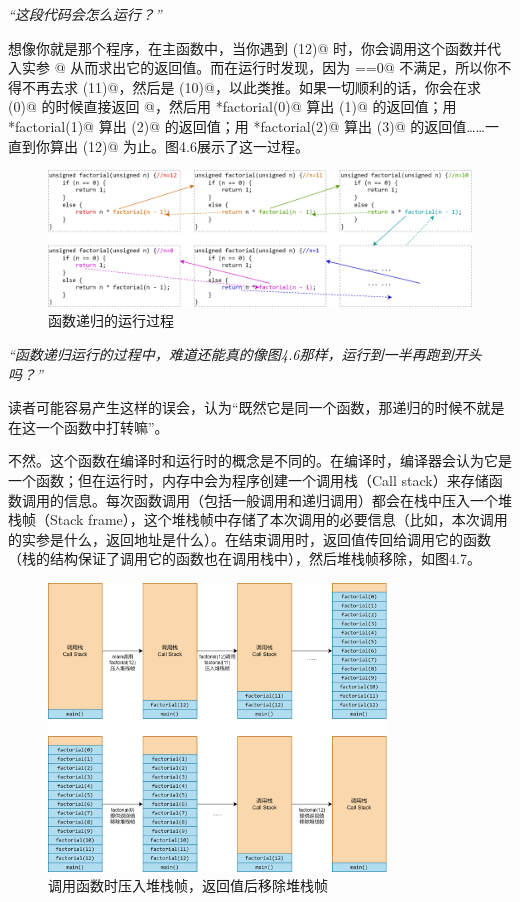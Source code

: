 \textit{``这段代码会怎么运行？''}\par
想像你就是那个程序，在主函数中，当你遇到 \lstinline@factorial(12)@ 时，你会调用这个函数并代入实参 @ 从而求出它的返回值。而在运行时发现，因为 \lstinline@n==0@ 不满足，所以你不得不再去求 \lstinline@factorial(11)@，然后是 \lstinline@factorial(10)@，以此类推。如果一切顺利的话，你会在求 \lstinline@factorial(0)@ 的时候直接返回 @，然后用 *factorial(0)@ 算出 \lstinline@factorial(1)@ 的返回值；用 *factorial(1)@ 算出 \lstinline@factorial(2)@ 的返回值；用 *factorial(2)@ 算出 \lstinline@factorial(3)@ 的返回值……一直到你算出 \lstinline@factorial(12)@ 为止。图4.6展示了这一过程。\par
\begin{figure}[htbp]
    \centering
    \includegraphics[width=\textwidth]{../images/generalized_parts/04_the_process_of_recursion_300.png}
    \caption{\lstinline@factorial@ 函数递归的运行过程}
\end{figure}
\textit{``函数递归运行的过程中，难道还能真的像图4.6那样，运行到一半再跑到开头吗？''}\par
读者可能容易产生这样的误会，认为``既然它是同一个函数，那递归的时候不就是在这一个函数中打转嘛''。\par
不然。这个函数在编译时和运行时的概念是不同的。在编译时，编译器会认为它是一个函数；但在运行时，内存中会为程序创建一个调用栈（Call stack）来存储函数调用的信息。每次函数调用（包括一般调用和递归调用）都会在栈中压入一个堆栈帧（Stack frame），这个堆栈帧中存储了本次调用的必要信息（比如，本次调用的实参是什么，返回地址是什么）。在结束调用时，返回值传回给调用它的函数（栈的结构保证了调用它的函数也在调用栈中），然后堆栈帧移除，如图4.7。\par
\begin{figure}[htbp]
    \centering
    \includegraphics[width=0.8\textwidth]{.//images/generalized_parts/04_call_stack_structure_300.png}
    \caption{调用函数时压入堆栈帧，返回值后移除堆栈帧}    
\end{figure}
